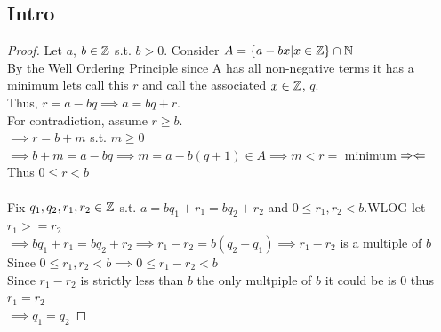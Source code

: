 \subsection{Intro}

\begin{proof}
    Let \(a\), \(b\in\mathbb{Z}\) s.t. \(b>0\). Consider \(A = \{a-bx | x\in\mathbb{Z}\} \cap\mathbb{N}\)\\
    By the Well Ordering Principle since A has all non-negative terms it has a minimum lets call this \(r\) and call the associated \(x\in\mathbb{Z}\), \(q\).\\
    Thus, \(r=a-bq \implies a=bq+r\).\\
    For contradiction, assume \(r\geq b\).\\
    \(\implies r=b+m\) s.t. \(m\geq0\)\\
    \(\implies b+m=a-bq \implies m=a-b(q+1)\in A \implies m < r = \) minimum \(\Rightarrow \Leftarrow\)
    Thus \(0 \leq r < b\)\\\\
    Fix  \(q_1,q_2,r_1,r_2\in\mathbb{Z}\) s.t. \(a=bq_1+r_1=bq_2+r_2\) and \(0\leq r_1,r_2<b\).\s\s WLOG let \(r_1>=r_2\)\\
    \(\implies bq_1+r_1=bq_2+r_2 \implies r_1-r_2=b(q_2-q_1) \implies r_1-r_2\) is a multiple of \(b\)\\
    Since \(0\leq r_1,r_2<b \implies 0\leq r_1-r_2<b\)\\
    Since \(r_1-r_2\) is strictly less than \(b\) the only multpiple of \(b\) it could be is \(0\) thus \(r_1=r_2\)\\
    \(\implies q_1=q_2\)
\end{proof}

